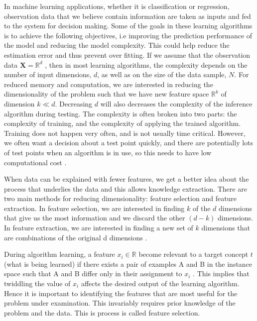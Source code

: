 In machine learning applications, whether it is classification or regression, observation
data that we believe contain information are taken as inputs and fed
to the system for decision making. Some of the goals in these learning algorithms is to achieve the following objectives, i.e improving the prediction performance of the model and reducing the model complexity. This could help reduce the estimation error and thus prevent over fitting. If we  assume that the observation data $\textbf{X}=\mathbb{R}^d$ \citep{shalev2014understanding}, then in most learning algorithms, the complexity depends on the number of
input dimensions, $d$, as well as on the size of the data sample, $N$. 
For reduced memory and computation, we are interested in reducing
the dimensionality of the problem such that we have new feature space $\mathbb{R}^k$ of dimension $k \ll d $. Decreasing $d$ will also decreases the
complexity of the inference algorithm during testing. The
complexity is often broken into two parts: the complexity of training, and the complexity of applying the trained algorithm. Training does not happen very often, and is not usually time critical. However, we often want a decision about a test point quickly, and there are potentially lots of test points when an algorithm is in use, so this needs to have low computational cost \citep{marsland2015machine}.

When data can be explained with fewer features, we get a better idea about the process that underlies the data and this allows knowledge extraction. There are two main methods for reducing dimensionality: feature selection and feature extraction. In feature selection, we are interested in
finding $k$ of the $d$ dimensions that give us the most information and we
discard the other $(d - k)$ dimensions. In feature extraction, we are interested in finding a new set of $k$ dimensions that are combinations of the original d dimensions \citep{alpaydin2014introduction}.
 
During algorithm learning, a feature $x_i\in\mathbb{R}$ become relevant to a target concept $t$ (what is being learned) if there exists a pair of examples A and B in the instance space such that A and B differ only in their assignment to  $x_i$ \citep{blum1997selection}. This implies that twiddling the value of $x_i$ affects the desired output of the learning algorithm. Hence it is important to identifying the features that are most useful for the problem under examination. This invariably requires prior knowledge of the problem and the data. This is process is called feature selection.

